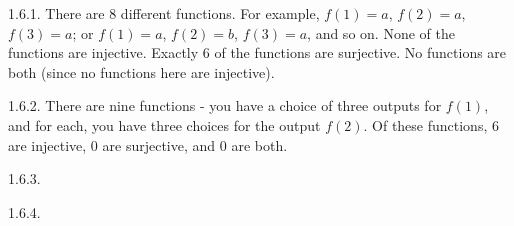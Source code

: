  \protect {} \protect \begin {itemize} 
\begin{ans}{1.6.1.}
	There are 8 different functions.  For example, $f(1) = a$, $f(2) = a$, $f(3) = a$; or $f(1) = a$, $f(2) = b$, $f(3) = a$, and so on.  None of the functions are injective.  Exactly 6 of the functions are surjective.  No functions are both (since no functions here are injective).
	
\end{ans}
\begin{ans}{1.6.2.}
	There are nine functions - you have a choice of three outputs for $f(1)$, and for each, you have three choices for the output $f(2)$.  Of these functions, 6 are injective, 0 are surjective, and 0 are both.
	
\end{ans}
\begin{ans}{1.6.3.}
	
\end{ans}
\begin{ans}{1.6.4.}
	
\end{ans}
\protect \end {itemize}

